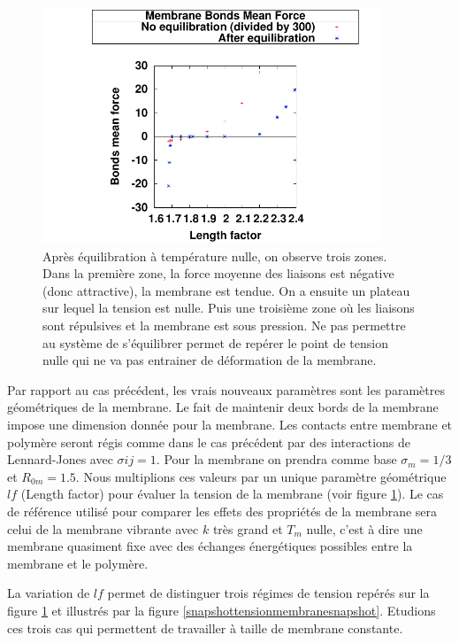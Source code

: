 \begin{figure}[H]
\begin{center}
\includegraphics[width=0.9\textwidth]{membranetensionplot.pdf}
\caption[Tension de la membrane]{Après équilibration à température nulle, on observe trois zones. Dans la première zone, la force moyenne des liaisons est négative (donc attractive), la membrane est tendue. On a ensuite un plateau sur lequel la tension est nulle. Puis une troisième zone où les liaisons sont répulsives et la membrane est sous pression. Ne pas permettre au système de s'équilibrer permet de repérer le point de tension nulle qui ne va pas entrainer de déformation de la membrane.}

\label{tensionmembrane}
\end{center}
\end{figure}

Par rapport au cas précédent, les vrais nouveaux paramètres sont les paramètres géométriques de la membrane. Le fait de maintenir deux bords de la membrane impose une dimension donnée pour la membrane.
Les contacts entre membrane et polymère seront régis comme dans le cas précédent par des interactions de Lennard-Jones avec $\sigma{ij}=1$. Pour la membrane on prendra comme base $\sigma_m= 1/3$ et $R_{0m}=1.5$. Nous multiplions ces valeurs par un unique paramètre géométrique $lf$ (Length factor) pour évaluer la tension de la membrane (voir figure \ref{tensionmembrane}). Le cas de référence utilisé pour comparer les effets des propriétés de la membrane sera celui de la membrane vibrante avec $k$ très grand et $T_m$ nulle, c'est à dire une membrane quasiment fixe avec des échanges énergétiques possibles entre la membrane et le polymère.

La variation de $lf$ permet de distinguer trois régimes de tension repérés sur la figure \ref{tensionmembrane} et illustrés par la figure \ref{snapshottensionmembranesnapshot}. Etudions ces trois cas qui permettent de travailler à taille de membrane constante.


